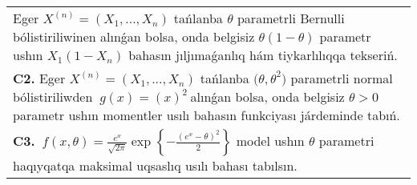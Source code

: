 \documentclass{article}
\begin{document}
\begin{tabular}{m{17cm}}
Eger \(X^{(n)} = \left( X_{1},...,X_{n} \right)\) tańlanba \(\theta\) parametrli Bernulli bólistiriliwinen alınǵan bolsa, onda belgisiz \(\theta(1 - \theta)\) parametr ushın \(X_{1}\left( 1 - X_{n} \right)\) bahasın jıljımaǵanlıq hám tiykarlılıqqa tekseriń.
 \\
\textbf{C2.} 
Eger \(X^{(n)} = \left( X_{1},...,X_{n} \right)\) tańlanba \({(\theta,\theta}^{2})\) parametrli normal bólistiriliwden \({\ g(x) = (x)}^{2}\ \)alınǵan bolsa, onda belgisiz \(\theta > 0\) parametr ushın momentler usılı bahasın funkciyası járdeminde tabıń.
 \\
\textbf{C3.} 
\(\ f(x,\theta) = \frac{e^{x}}{\sqrt{2\pi}}\exp\left\{ - \frac{\left( e^{x} - \theta \right)^{2}}{2} \right\}\) model ushın \(\theta\) parametri haqıyqatqa maksimal uqsaslıq usılı bahası tabılsın.
 \\

\end{tabular}
\vspace{1cm}
\end{document}
